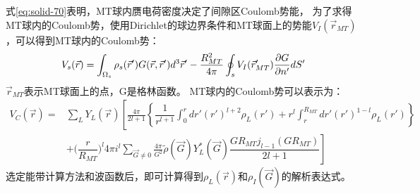 式\eqref{eq:solid-70}表明，MT球内赝电荷密度决定了间隙区Coulomb势能，
为了求得MT球内的Coulomb势，使用Dirichlet的球边界条件\cite{Landau-Lifshitz}和MT球面上的势能$V_I(\vec r_{MT})$，可以得到MT球内的Coulomb势：
\begin{displaymath}
  V_s(\vec r)=\int_{\Omega_s}\rho_s(\vec r')G(\vec r,\vec r')d^3\vec r'-\dfrac{R_{MT}^2}{4\pi}\ointop\nolimits_sV_I(\vec r_{MT}')\frac{\partial G}{\partial n'}dS'
  \label{eq:solid-77}
\end{displaymath}
$\vec r_{MT}$表示MT球面上的点，G是格林函数。%
MT球内的Coulomb势可以表示为：
\begin{displaymath}
  \begin{split}
    V_C(\vec r)=&\sum_LY_L(\vec r)\left[\frac{4\pi}{2l+1}\left\{\dfrac1{r^{l+1}}\int_0^rdr'(r')^{l+2}\rho_L(r')+r^l\int_r^{R_{MT}}dr'(r')^{1-l}\rho_L(r')\right\}\right.\\
    &+\biggl(\dfrac r{R_{MT}}\biggr)^l4\pi i^l\sum_{\vec G\neq0}\frac{4\pi}{G^2}\tilde\rho(\vec G)Y_L^{\ast}(\vec G)\left.\dfrac{GR_{MT}j_{l-1}(GR_{MT})}{2l+1}\right]
  \end{split}
\end{displaymath}
选定能带计算方法和波函数后，即可计算得到$\rho_L(\vec r)$和$\rho_I(\vec G)$的解析表达式。

